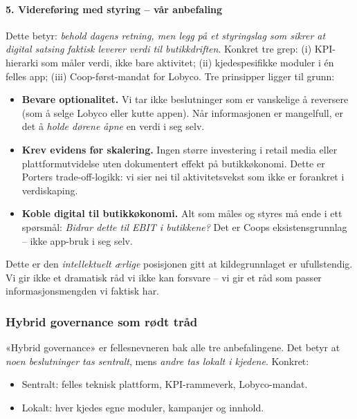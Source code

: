\paragraph{5. Videreføring med styring -- vår anbefaling}
Dette betyr: \emph{behold dagens retning, men legg på et styringslag som
sikrer at digital satsing faktisk leverer verdi til butikkdriften}.
Konkret tre grep: (i) KPI-hierarki som måler verdi, ikke bare aktivitet;
(ii) kjedespesifikke moduler i én felles app; (iii) Coop-først-mandat
for Lobyco. Tre prinsipper ligger til grunn:

\begin{itemize}
  \item \textbf{Bevare optionalitet.} Vi tar ikke beslutninger som er
    vanskelige å reversere (som å selge Lobyco eller kutte appen). Når
    informasjonen er mangelfull, er det å \emph{holde dørene åpne} en
    verdi i seg selv.
  \item \textbf{Krev evidens før skalering.} Ingen større investering i
    retail media eller plattformutvidelse uten dokumentert effekt på
    butikkøkonomi. Dette er Porters trade-off-logikk: vi sier nei til
    aktivitetsvekst som ikke er forankret i verdiskaping.
  \item \textbf{Koble digital til butikkøkonomi.} Alt som måles og
    styres må ende i ett spørsmål: \emph{Bidrar dette til EBIT i
    butikkene?} Det er Coops eksistensgrunnlag -- ikke app-bruk i seg
    selv.
\end{itemize}

Dette er den \emph{intellektuelt ærlige} posisjonen gitt at
kildegrunnlaget er ufullstendig. Vi gir ikke et dramatisk råd vi ikke
kan forsvare -- vi gir et råd som passer informasjonsmengden vi faktisk
har.

\subsubsection*{Hybrid governance som rødt tråd}
«Hybrid governance» er fellesnevneren bak alle tre anbefalingene. Det
betyr at \emph{noen beslutninger tas sentralt}, mens \emph{andre tas
lokalt i kjedene}. Konkret:

\begin{itemize}
  \item Sentralt: felles teknisk plattform, KPI-rammeverk,
    Lobyco-mandat.
  \item Lokalt: hver kjedes egne moduler, kampanjer og innhold.
\end{itemize}

